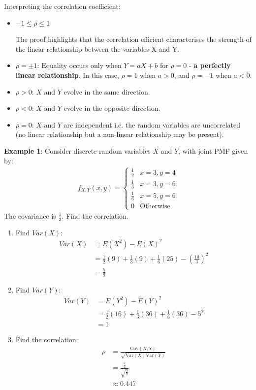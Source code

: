 \documentclass[10pt,a4paper]{article}
\begin{document}
Interpreting the correlation coefficient:
\begin{itemize}
    \item  $-1 \leq \rho \leq 1$
    
    The proof highlights that the correlation efficient characterises the strength of the linear
    relationship between the variables X and Y.
    
    \item $\rho = \pm 1$: Equality occurs only when $Y = aX + b$ for $\rho= 0$ - \textbf{a
    perfectly linear relationship}. In this case, $\rho = 1$ when $a > 0$, and
    $\rho = -1$ when $a < 0$.

    \item $\rho > 0$: $X$ and $Y$ evolve in the same direction. 
    \item $\rho < 0$: $X$ and $Y$ evolve in the opposite direction. 
    \item $\rho = 0$: $X$ and $Y$ are independent i.e. the random variables are uncorrelated (no
    linear relationship but a non-linear relationship may be present).
\end{itemize}

\textbf{Example 1}: Consider discrete random variables $X$ and $Y$, with joint PMF given by:
\begin{align*}
    f_{X,Y}(x,y) = 
    \begin{cases}
        \frac{1}{2} & x=3, y=4 \\
        \frac{1}{3} & x=3, y=6 \\
        \frac{1}{6} & x=5, y=6 \\
        0 & \text{Otherwise}
    \end{cases}
\end{align*}
The covariance is $\frac{1}{3}$. Find the correlation.
\begin{enumerate}
    \item Find $Var(X)$:
    \begin{align*}
        Var(X) &= E(X^2)-E(X)^2 \\
        &= \frac{1}{2}(9) + \frac{1}{3}(9) + \frac{1}{6}(25) - \left(\frac{10}{3}\right)^2 \\
        &= \frac{5}{9}
    \end{align*}
    \item Find $Var(Y)$:
    \begin{align*}
        Var(Y) &= E(Y^2)-E(Y)^2 \\
        &= \frac{1}{2}(16) + \frac{1}{3}(36) + \frac{1}{6}(36) - 5^2 \\
        &= 1
    \end{align*}
    \item Find the correlation:
    \begin{align*}
        \rho &= \frac{\text{Cov}(X,Y)}{\sqrt{\text{Var}(X)\text{Var}(Y)}} \\
        &= \frac{\frac{1}{3}}{\sqrt{\frac{5}{9}}} \\
        &\approx 0.447
    \end{align*}
\end{enumerate}
\end{document}
